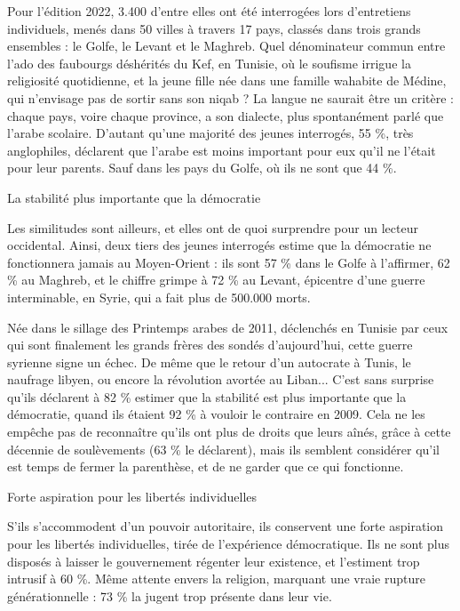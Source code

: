 Pour l'édition 2022, 3.400 d'entre elles ont été interrogées lors d'entretiens individuels, menés dans 50 villes à travers 17 pays, classés dans trois grands ensembles : le Golfe, le Levant et le Maghreb. Quel dénominateur commun entre l'ado des faubourgs déshérités du Kef, en Tunisie, où le soufisme irrigue la religiosité quotidienne, et la jeune fille née dans une famille wahabite de Médine, qui n'envisage pas de sortir sans son niqab ? La langue ne saurait être un critère : chaque pays, voire chaque province, a son dialecte, plus spontanément parlé que l'arabe scolaire. D'autant qu'une majorité des jeunes interrogés, 55 \%, très anglophiles, déclarent que l'arabe est moins important pour eux qu'il ne l'était pour leur parents. Sauf dans les pays du Golfe, où ils ne sont que 44 \%.

La stabilité plus importante que la démocratie

Les similitudes sont ailleurs, et elles ont de quoi surprendre pour un lecteur occidental. Ainsi, deux tiers des jeunes interrogés estime que la démocratie ne fonctionnera jamais au Moyen-Orient : ils sont 57 \% dans le Golfe à l'affirmer, 62 \% au Maghreb, et le chiffre grimpe à 72 \% au Levant, épicentre d'une guerre interminable, en Syrie, qui a fait plus de 500.000 morts.

Née dans le sillage des Printemps arabes de 2011, déclenchés en Tunisie par ceux qui sont finalement les grands frères des sondés d'aujourd'hui, cette guerre syrienne signe un échec. De même que le retour d'un autocrate à Tunis, le naufrage libyen, ou encore la révolution avortée au Liban... C'est sans surprise qu'ils déclarent à 82 \% estimer que la stabilité est plus importante que la démocratie, quand ils étaient 92 \% à vouloir le contraire en 2009. Cela ne les empêche pas de reconnaître qu'ils ont plus de droits que leurs aînés, grâce à cette décennie de soulèvements (63 \% le déclarent), mais ils semblent considérer qu'il est temps de fermer la parenthèse, et de ne garder que ce qui fonctionne.

Forte aspiration pour les libertés individuelles

S'ils s'accommodent d'un pouvoir autoritaire, ils conservent une forte aspiration pour les libertés individuelles, tirée de l'expérience démocratique. Ils ne sont plus disposés à laisser le gouvernement régenter leur existence, et l'estiment trop intrusif à 60 \%. Même attente envers la religion, marquant une vraie rupture générationnelle : 73 \% la jugent trop présente dans leur vie.

